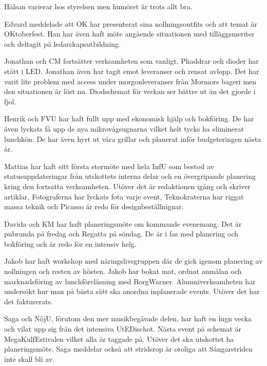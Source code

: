 \documentclass[10pt]{article}
\begin{document}
\begin{paragrafer}
\begin{fyllnadsval}
\end{fyllnadsval}

\begin{paragrafer}
Hälsan varierar hos styrelsen men humöret är trots allt bra.


Edvard meddelade att OK har presenterat sina nollningsoutfits och att temat är OKtoberfest. Han har även haft möte angående situationen med tilläggsmeriter och deltagit på ledarskapsutbildning.

Jonathan och CM fortsätter verksamheten som vanligt. Phaddrar och dioder har stått i LED. Jonathan även har tagit emot leveranser och rensat avlopp. Det har varit lite problem med access under morgonleveranser från Mormors bageri men den situationen är löst nu. Diodschemat för veckan ser bättre ut än det gjorde i fjol. 

Henrik och FVU har haft fullt upp med ekonomisk hjälp och bokföring. De har även lyckats få upp de nya mikrovågsugnarna vilket helt tycks ha eliminerat lunchkön. De har även hyrt ut våra grillar och planerat inför budgeteringen nästa år.  

Mattias har haft sitt första stormöte med hela InfU som bestod av statusuppdateringar från utskottets interna delar och en övergripande planering kring den fortsatta verksamheten. Utöver det är redaktionen igång och skriver artiklar, Fotograferna har lyckats fota varje event, Teknokraterna har riggat massa teknik och Picasso är redo för designbeställnignar. 

Davida och KM har haft planeringsmöte om kommande evenemang. Det är pubrunda på fredag och Regatta på söndag. De är i fas med planering och bokföring och är redo för en intensiv helg. 

Jakob har haft workshop med näringslivsgruppen där de gick igenom planering av nollningen och resten av hösten. Jakob har bokat mat, ordnat anmälan och marknadsföring av lunchföreläsning med BorgWarner. Alumniverksamheten har undersökt hur man på bästa sätt ska anordna inplanerade events. Utöver det har det fakturerats.  

Saga och NöjU, förutom den mer musikbegåvade delen, har haft en lugn vecka och vilat upp sig från det intensiva UtEDischot. Nästa event på schemat är MegaKulfEstivalen vilket alla är taggade på. Utöver det ska utskottet ha planeringsmöte. Saga meddelar också att stridsrop är oroliga att Sångarstriden inte skall bli av. 


\end{paragrafer}
\end{paragrafer}
\end{document}
